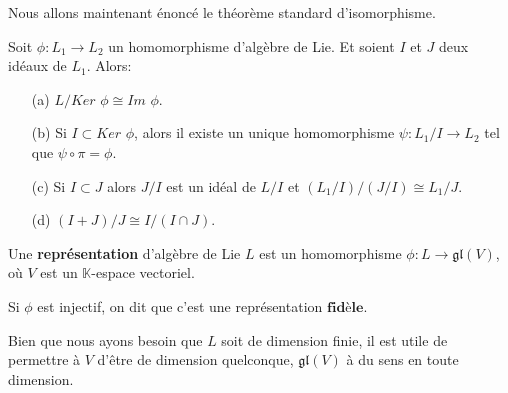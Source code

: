 \documentclass[a4paper,openany,12pt]{report}
\newcommand{\KK}{\mathbb{K}}
\newcommand{\gl}{\mathfrak{gl}}
\theoremstyle{break}
{\theorembodyfont{\upshape}
\newtheorem*{rmq}{Remarque :}
\newtheorem*{prv}{Preuve :}
\newtheorem*{ex}{Exemples :}
\newtheorem*{exe}{Exemple : }
\newtheorem*{nota}{Notation :}
\newtheorem*{dem}{D\'emonstration :}}
\begin{document}
\quad Nous allons maintenant énoncé le théorème standard d'isomorphisme.

\begin{thm}\label{thm:iso}
Soit $\phi: L_{1}  \to L_{2} $ un homomorphisme d'algèbre de Lie. Et soient $I$ et $J$ deux idéaux de $L_{1}$.
Alors: 
\begin{itemize}
\item[(a)] $L / Ker$ $\phi \cong Im$ $\phi$.
\item[(b)] Si $I \subset Ker$ $\phi$, alors il existe un unique homomorphisme $\psi: L_{1} / I \to L_{2} $ tel que $\psi \circ \pi= \phi$.
\item[(c)] Si $I \subset J$ alors $J / I$ est un idéal de $L/ I$ et $(L_{1} / I) /(J / I)\cong L_{1} / J$.
\item[(d)] $(I+J) / J \cong I /(I \cap J)$.
\end{itemize}
\end{thm}

\begin{df}
\quad  Une \textbf{représentation} d’algèbre de Lie $L$ est un homomorphisme $\phi: L \rightarrow \gl(V)$, où $V$ est un $\KK$-espace vectoriel.

Si $\phi$ est injectif, on dit que c'est une représentation  $\textbf{fidèle}$.
\end{df}

\quad Bien que nous ayons besoin que $L$ soit de dimension finie, il est utile de permettre à $V$ d'être de dimension quelconque, $\gl(V)$ à du sens en toute dimension.
\end{document}
